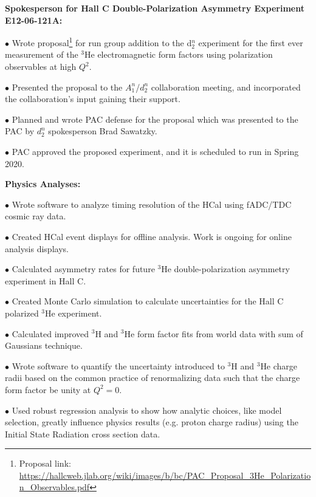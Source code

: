 \documentclass[letterpaper,10pt]{article}
\renewenvironment{itemize}{
  \begin{list}{}{
    \setlength{\leftmargin}{1.5em}
  }
}{
  \end{list}
}
\begin{document}
{\begin{itemize}
\begin{itemize}
		\item \textbf{Spokesperson for Hall C Double-Polarization Asymmetry Experiment E12-06-121A:}
			\begin{itemize}\itemsep5pt
				\item $\bullet$ Wrote proposal\footnote{Proposal link: \url{https://hallcweb.jlab.org/wiki/images/b/bc/PAC_Proposal_3He_Polarization_Observables.pdf}} for run group addition to the d$_2^n$ experiment for the first ever measurement of the $^3$He electromagnetic form factors using polarization observables at high $Q^2$.
				\item $\bullet$ Presented the proposal to the $A_1^n$/$d_2^n$ collaboration meeting, and incorporated the collaboration's input gaining their support.
				\item $\bullet$ Planned and wrote PAC defense for the proposal which was presented to the PAC by $d_2^n$ spokesperson Brad Sawatzky.
				\item $\bullet$ PAC approved the proposed experiment, and it is scheduled to run in Spring 2020.
			\end{itemize}
			
		\item \textbf{Physics Analyses:}
			\begin{itemize}\itemsep5pt
				\item $\bullet$ Wrote software to analyze timing resolution of the HCal using fADC/TDC cosmic ray data.
				\item $\bullet$ Created HCal event displays for offline analysis. Work is ongoing for online analysis displays.
				\item $\bullet$ Calculated asymmetry rates for future $^3$He double-polarization asymmetry experiment in Hall C. 
				\item $\bullet$ Created Monte Carlo simulation to calculate uncertainties for the Hall C polarized $^3$He experiment. 
				\item $\bullet$ Calculated improved $^3$H and $^3$He form factor fits from world data with sum of Gaussians technique.
				\item $\bullet$ Wrote software to quantify the uncertainty introduced to $^3$H and $^3$He charge radii based on the common practice of renormalizing data such that the charge form factor be unity at $Q^2=0$.
				\item $\bullet$ Used robust regression analysis to show how analytic choices, like model selection, greatly influence physics results (e.g. proton charge radius) using the Initial State Radiation cross section data.
			\end{itemize}
			

\end{itemize}
\end{itemize}}
\end{document}
